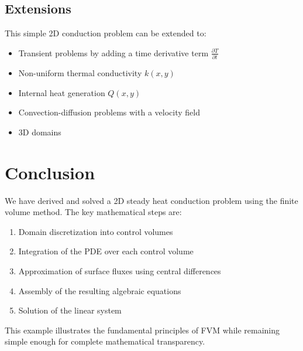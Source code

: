 \documentclass{article}
\begin{document}
\subsection{Extensions}
This simple 2D conduction problem can be extended to:
\begin{itemize}
    \item Transient problems by adding a time derivative term $\frac{\partial T}{\partial t}$
    \item Non-uniform thermal conductivity $k(x,y)$
    \item Internal heat generation $Q(x,y)$
    \item Convection-diffusion problems with a velocity field
    \item 3D domains
\end{itemize}

\section{Conclusion}

We have derived and solved a 2D steady heat conduction problem using the finite volume method. The key mathematical steps are:
\begin{enumerate}
    \item Domain discretization into control volumes
    \item Integration of the PDE over each control volume
    \item Approximation of surface fluxes using central differences
    \item Assembly of the resulting algebraic equations
    \item Solution of the linear system
\end{enumerate}

This example illustrates the fundamental principles of FVM while remaining simple enough for complete mathematical transparency.
\end{document}
